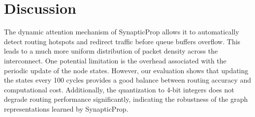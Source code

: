 \section{Discussion}
\label{sec:discussion}
The dynamic attention mechanism of SynapticProp allows it to automatically detect routing hotspots and redirect traffic before queue buffers overflow. This leads to a much more uniform distribution of packet density across the interconnect. One potential limitation is the overhead associated with the periodic update of the node states. However, our evaluation shows that updating the states every 100 cycles provides a good balance between routing accuracy and computational cost. Additionally, the quantization to 4-bit integers does not degrade routing performance significantly, indicating the robustness of the graph representations learned by SynapticProp.
